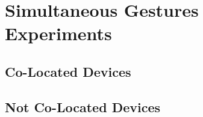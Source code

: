 


\section{Simultaneous Gestures \\ Experiments}
\label{sec:Simultaneous}

\subsection{Co-Located Devices}

\subsection{Not Co-Located Devices}


 

